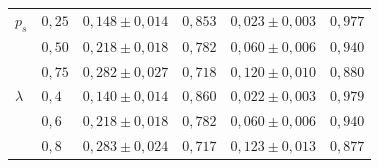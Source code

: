 \documentclass[12pt]{extarticle}
\numberwithin{equation}{section}
\begin{document}
\begin{table}[ht]
\begin{tabular}{@{}l l c c c c@{}}
    \addlinespace
    $p_s$   & $0{,}25$ & $0{,}148 \pm 0{,}014$ & $0{,}853$ & $0{,}023 \pm 0{,}003$ & $0{,}977$ \\
            & $0{,}50$ & $0{,}218 \pm 0{,}018$ & $0{,}782$ & $0{,}060 \pm 0{,}006$ & $0{,}940$ \\
            & $0{,}75$ & $0{,}282 \pm 0{,}027$ & $0{,}718$ & $0{,}120 \pm 0{,}010$ & $0{,}880$ \\
    \addlinespace
    $\lambda$ & $0{,}4$ & $0{,}140 \pm 0{,}014$ & $0{,}860$ & $0{,}022 \pm 0{,}003$ & $0{,}979$ \\
              & $0{,}6$ & $0{,}218 \pm 0{,}018$ & $0{,}782$ & $0{,}060 \pm 0{,}006$ & $0{,}940$ \\
              & $0{,}8$ & $0{,}283 \pm 0{,}024$ & $0{,}717$ & $0{,}123 \pm 0{,}013$ & $0{,}877$ \\
    \bottomrule
  \end{tabular}
\end{table}
\end{document}

